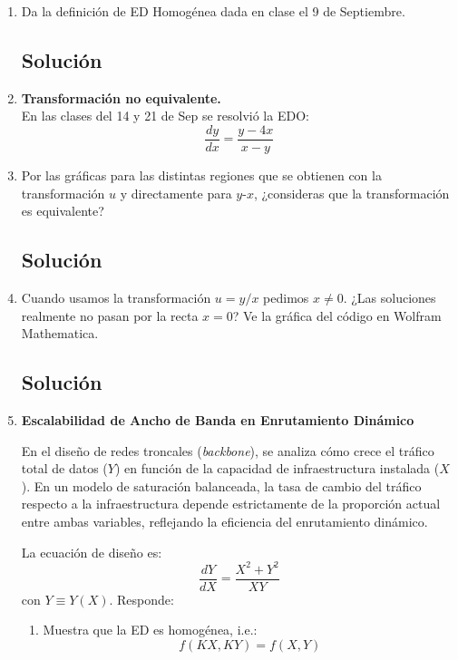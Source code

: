 \begin{enumerate}[label=\arabic*., leftmargin=*]
    \item Da la definición de ED Homogénea dada en clase el 9 de Septiembre.
    \subsection*{Solución}

    \item \textbf{Transformación no equivalente.} \\
    En las clases del 14 y 21 de Sep se resolvió la EDO:
    \[ \frac{dy}{dx} = \frac{y-4x}{x-y} \]

    \item Por las gráficas para las distintas regiones que se obtienen con la transformación $u$ y directamente para $y$-$x$, ¿consideras que la transformación es equivalente?
    \subsection*{Solución}

    \item Cuando usamos la transformación $u=y/x$ pedimos $x \neq 0$. ¿Las soluciones realmente no pasan por la recta $x=0$? Ve la gráfica del código en Wolfram Mathematica.
    \subsection*{Solución}

    \item \textbf{Escalabilidad de Ancho de Banda en Enrutamiento Dinámico}

    En el diseño de redes troncales (\textit{backbone}), se analiza cómo crece el tráfico total de datos ($Y$) en función de la capacidad de infraestructura instalada ($X$). En un modelo de saturación balanceada, la tasa de cambio del tráfico respecto a la infraestructura depende estrictamente de la proporción actual entre ambas variables, reflejando la eficiencia del enrutamiento dinámico.

    La ecuación de diseño es:
    \[ \frac{dY}{dX} = \frac{X^{2}+Y^{2}}{XY} \]
    con $Y \equiv Y(X)$. Responde:

    \begin{enumerate}[label=(\alph*), leftmargin=*]
        \item Muestra que la ED es homogénea, i.e.:
        \[ f(KX, KY) = f(X, Y) \]


\end{enumerate}
\end{enumerate}
